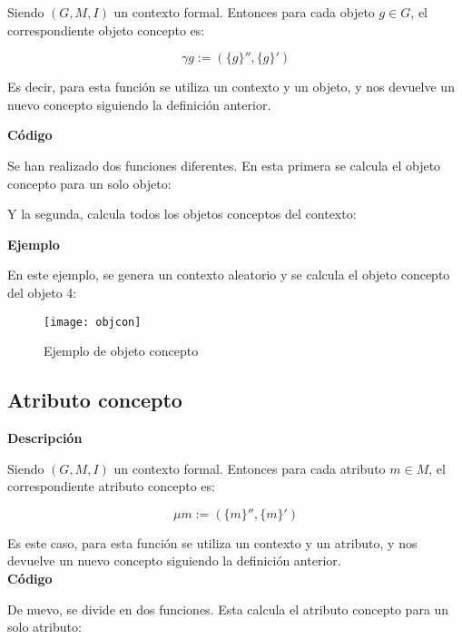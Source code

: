        Siendo \( (G, M, I) \) un contexto formal. Entonces para cada objeto \( g \in G\), el correspondiente objeto concepto es:

        \[ \gamma g:=(\{g\}'', \{g\}') \]

        Es decir, para esta funci\'on se utiliza un contexto y un objeto, y nos devuelve un nuevo concepto siguiendo la definici\'on 
        anterior.
        \\

        \clearpage

        \textbf{C\'odigo}

        Se han realizado dos funciones diferentes. En esta primera se calcula el objeto concepto para un solo objeto:
        
        

        Y la segunda, calcula todos los objetos conceptos del contexto:
        

        \bigskip

        \textbf{Ejemplo}

        En este ejemplo, se genera un contexto aleatorio y se calcula el objeto concepto del objeto 4:

        \begin{figure}[H]
            \centering
            \texttt{[image: objcon]}
            \caption{Ejemplo de objeto concepto}
            \label{fig:objcon}
        \end{figure}




    \subsection{Atributo concepto}

    
        \textbf{Descripci\'on}

        Siendo \( (G, M, I) \) un contexto formal. Entonces para cada atributo \( m \in M\), el correspondiente atributo concepto es:

        \[ \mu m:=(\{m\}'', \{m\}') \]

        Es este caso, para esta funci\'on se utiliza un contexto y un atributo, y nos devuelve un nuevo concepto siguiendo la definici\'on 
        anterior.
        \\


        \textbf{C\'odigo}

        De nuevo, se divide en dos funciones. Esta calcula el atributo concepto para un solo atributo:

